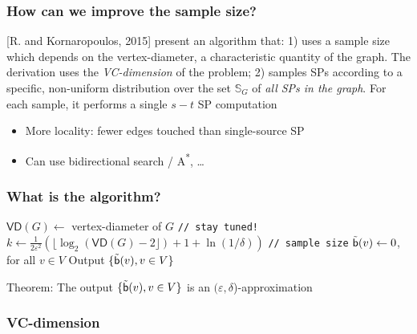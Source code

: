 \begin{frame}
  \frametitle{How can we improve the sample size?}
  [R. and Kornaropoulos, 2015] present an algorithm that:
  \vfill
  1) uses a sample size which depends on the vertex-diameter, a characteristic
  quantity of the graph. The derivation uses the \emph{VC-dimension} of the
  problem;
  \vfill
  2) samples SPs according to a specific, non-uniform distribution over the set
  $\mathbb{S}_G$ of \emph{all SPs in the graph}. For each sample, it performs a
  single $s-t$ SP computation
  \begin{itemize}
    \item More locality: fewer edges touched than single-source SP
    \item Can use bidirectional search / A\textsuperscript{*},
      \ldots
  \end{itemize}
\end{frame}

\begin{frame}
  \frametitle{What is the algorithm?}
  \begin{algorithm}[H]
    \DontPrintSemicolon
    $\mathsf{VD}(G)\leftarrow$ vertex-diameter of $G$ \texttt{// stay
    tuned!}\;
    $k\leftarrow\frac{1}{2\varepsilon^2}\left(\lfloor\log_2(\mathsf{VD}(G)-2\rfloor)
    +1 + \ln(1/\delta)\right)$ \texttt{// sample size}\;
    $\tilde{\mathsf{b}}(v)\leftarrow 0$, for all $v\in V$\;
    Output $\{\tilde{\mathsf{b}}(v), v\in V\}$
  \end{algorithm}
  Theorem: The output $\{\tilde{\mathsf{b}}(v), v\in V\}$ is an
  $(\varepsilon,\delta$)-approximation
\end{frame}

\begin{frame}
  \frametitle{VC-dimension}
\end{frame}

